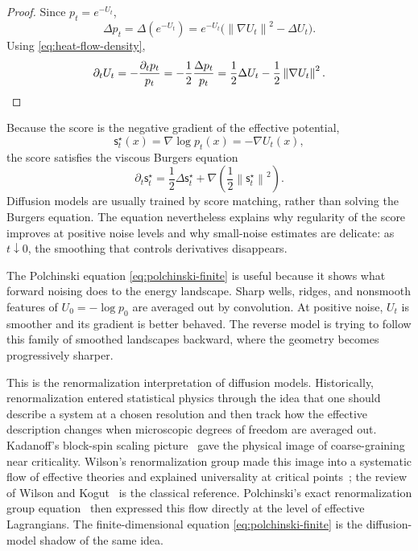 \documentclass{amsart}
\numberwithin{equation}{section}
\theoremstyle{plain}
\theoremstyle{definition}
\theoremstyle{remark}
\newcommand{\norm}[1]{\left\lVert #1 \right\rVert}
\newcommand{\sstar}{\mathsf{s}^{\star}}
\begin{document}
\begin{proof}
Since $p_t=e^{-U_t}$,
\[
    \Delta p_t
    =
    \Delta(e^{-U_t})
    =
    e^{-U_t}\bigl(\norm{\nabla U_t}^2-\Delta U_t\bigr).
\]
Using \eqref{eq:heat-flow-density},
\begin{equation*}
    \partial_t U_t
    =
    -\frac{\partial_t p_t}{p_t}
    =
    -\frac12\frac{\Delta p_t}{p_t}
    =
    \frac12\Delta U_t-\frac12\norm{\nabla U_t}^2. \qedhere
\end{equation*}
\end{proof}

Because the score is the negative gradient of the effective potential,
\[
    \sstar_t(x)=\nabla\log p_t(x)=-\nabla U_t(x),
\]
the score satisfies the viscous Burgers equation
\begin{equation}\label{eq:burgers-score}
    \partial_t \sstar_t
    =
    \frac12\Delta \sstar_t
    +
    \nabla\left(\frac12\norm{\sstar_t}^2\right).
\end{equation}
Diffusion models are usually trained by score matching, rather than solving the Burgers equation.  The equation
nevertheless explains why regularity of the score improves at positive noise
levels and why small-noise estimates are delicate: as $t\downarrow0$, the
smoothing that controls derivatives disappears.

The Polchinski equation \eqref{eq:polchinski-finite} is useful because it shows what forward noising does to the energy landscape.  Sharp
wells, ridges, and nonsmooth features of $U_0=-\log p_0$ are averaged out by
convolution.  At positive noise, $U_t$ is smoother and its gradient is better
behaved.  The reverse model is trying to follow this family of smoothed
landscapes backward, where the geometry becomes progressively sharper.

This is the renormalization interpretation of diffusion models.  Historically,
renormalization entered statistical physics through the idea that one should
describe a system at a chosen resolution and then track how the effective
description changes when microscopic degrees of freedom are averaged out.
Kadanoff's block-spin
scaling picture~\cite{kadanoff1966scaling} gave the physical image of
coarse-graining near criticality.  Wilson's renormalization group made this
image into a systematic flow of effective theories and explained universality
at critical points~\cite{wilson1971rg1,wilson1971rg2}; the review of
Wilson and Kogut~\cite{wilson1974renormalization} is the classical reference.
Polchinski's exact renormalization group equation~\cite{polchinski1984renormalization}
then expressed this flow directly at the level of effective Lagrangians.  The
finite-dimensional equation \eqref{eq:polchinski-finite} is the diffusion-model
shadow of the same idea.
\end{document}
